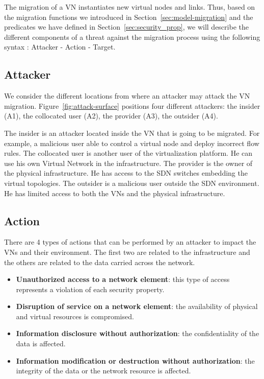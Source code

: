 \label{sec:attacker-model}
The migration of a VN instantiates new virtual nodes and links.
Thus, based on  the migration functions we introduced in Section~\ref{sec:model-migration} and the predicates we have defined in Section~\ref{sec:security_prop}, we will describe the different components of a threat against the migration process using the following syntax
: Attacker - Action - Target.



\subsection{Attacker}
We consider the different locations from where an attacker may attack the VN migration. 
Figure~\ref{fig:attack-surface} positions four different attackers: the insider (A1), the collocated user (A2), the provider (A3), the outsider (A4).

The insider is an attacker located inside the VN that is going to be migrated.
For example, a malicious user able to control a virtual node and deploy incorrect flow rules.
The collocated user is another user of the virtualization platform.
He can use his own Virtual Network in the infrastructure.
The provider is the owner of the physical infrastructure.
He has access to the SDN switches embedding the virtual topologies.
The outsider is a malicious user outside the SDN environment.
He has limited access to both the VNs and the physical infrastructure.

\subsection{Action}
There are 4 types of actions that can be performed by an attacker to impact the VNs and their environment.
The first two are related to the infrastructure and the others are related to the data carried across the network.
\begin{itemize}
\item \textbf{Unauthorized access to a network element}:
this type of access represents a violation of each security property.
\item \textbf{Disruption of service on a network element}:
the availability of physical and virtual resources is compromised.
\item \textbf{Information disclosure without authorization}:
the confidentiality of the data is affected.
\item \textbf{Information modification or destruction without authorization}:
the integrity of the data or the network resource is affected.
\end{itemize}

